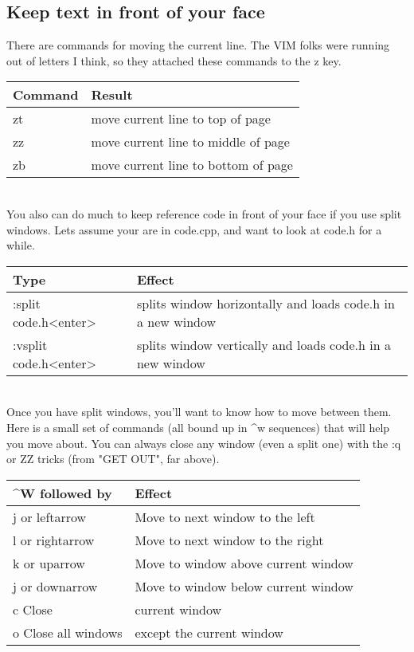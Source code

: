 \documentclass[a4paper, 12pt]{article}
\begin{document}
\subsection{Keep text in front of your face}
\label{"Keep text in front of your face"}
There are commands for moving the current line. The VIM folks were running out of letters I think, so they attached these commands to the z key.

\begin{tabular}{ l | p{8cm} }
  \textbf{Command} & \textbf{Result}\\ \hline
      zt	& move current line to top of page \\
      zz	& move current line to middle of page \\
      zb	& move current line to bottom of page \\ \hline
\end{tabular}\\

You also can do much to keep reference code in front of your face if you use split windows. Lets assume your are in code.cpp, and want to look at code.h for a while.

\begin{tabular}{ l | p{8cm} }
  \textbf{Type} & \textbf{Effect}\\ \hline
      :split code.h<enter>  & splits window horizontally and loads code.h in a new window\\
      :vsplit code.h<enter> & splits window vertically and loads code.h in a new window\\ \hline
\end{tabular}\\

Once you have split windows, you'll want to know how to move between them. Here is a small set of commands (all bound up in ^w sequences) that will help you move about. You can always close any window (even a split one) with the :q or ZZ tricks (from "GET OUT", far above).

\begin{tabular}{ l | p{8cm} }
  \textbf{^W followed by} & \textbf{Effect}\\ \hline
      j or leftarrow	  & Move to next window to the left\\
      l or rightarrow	  & Move to next window to the right\\
      k or uparrow	      & Move to window above current window\\
      j or downarrow	  & Move to window below current window\\
      c	Close             & current window\\
      o	Close all windows & except the current window\\ \hline
\end{tabular}\\
\end{document}
